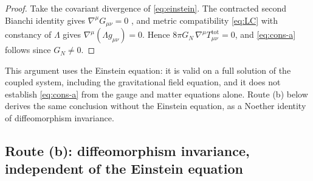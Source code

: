 \documentclass[11pt,a4paper]{article}
\theoremstyle{plain}
\theoremstyle{definition}
\theoremstyle{remark}
\begin{document}
\begin{proof}
Take the covariant divergence of \eqref{eq:einstein}. The contracted second Bianchi identity gives
$\nabla^{\mu}G_{\mu\nu}=0$ \cite{Wald}, and metric compatibility \eqref{eq:LC} with constancy of
$\Lambda$ gives $\nabla^{\mu}(\Lambda g_{\mu\nu})=0$. Hence
$8\pi G_N\,\nabla^\mu T^{\mathrm{tot}}_{\mu\nu}=0$, and \eqref{eq:cons-a} follows since
$G_N\neq0$.
\end{proof}

This argument uses the Einstein equation: it is valid on a full solution of the coupled system,
including the gravitational field equation, and it does not establish \eqref{eq:cons-a} from the
gauge and matter equations alone. Route (b) below derives the same conclusion without the Einstein
equation, as a Noether identity of diffeomorphism invariance.

\subsection{Route (b): diffeomorphism invariance, independent of the Einstein equation}
\end{document}
